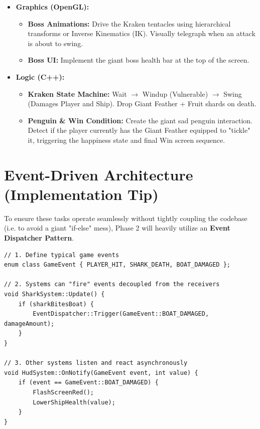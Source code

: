 \documentclass[12pt,a4paper]{article}
\begin{document}
\begin{itemize}[leftmargin=*]
    \item \textbf{Graphics (OpenGL):}
    \begin{itemize}
        \item \textbf{Boss Animations:} Drive the Kraken tentacles using hierarchical transforms or Inverse Kinematics (IK). Visually telegraph when an attack is about to swing.
        \item \textbf{Boss UI:} Implement the giant boss health bar at the top of the screen. 
    \end{itemize}
    \item \textbf{Logic (C++):}
    \begin{itemize}
        \item \textbf{Kraken State Machine:} Wait $\rightarrow$ Windup (Vulnerable) $\rightarrow$ Swing (Damages Player and Ship). Drop Giant Feather + Fruit shards on death.
        \item \textbf{Penguin \& Win Condition:} Create the giant sad penguin interaction. Detect if the player currently has the Giant Feather equipped to "tickle" it, triggering the happiness state and final Win screen sequence.
    \end{itemize}
\end{itemize}

\section{Event-Driven Architecture (Implementation Tip)}

To ensure these tasks operate seamlessly without tightly coupling the codebase (i.e. to avoid a giant "if-else" mess), Phase 2 will heavily utilize an \textbf{Event Dispatcher Pattern}.

\begin{lstlisting}[style=cppstyle, caption={Event Dispatcher Example}]
// 1. Define typical game events
enum class GameEvent { PLAYER_HIT, SHARK_DEATH, BOAT_DAMAGED };

// 2. Systems can "fire" events decoupled from the receivers
void SharkSystem::Update() {
    if (sharkBitesBoat) {
        EventDispatcher::Trigger(GameEvent::BOAT_DAMAGED, damageAmount);
    }
}

// 3. Other systems listen and react asynchronously
void HudSystem::OnNotify(GameEvent event, int value) {
    if (event == GameEvent::BOAT_DAMAGED) {
        FlashScreenRed();
        LowerShipHealth(value);
    }
}
\end{lstlisting}
\end{document}
